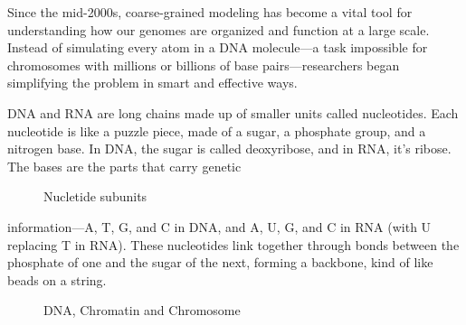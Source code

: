 \documentclass[12pt]{article}
\begin{document}
\begin{flushleft}
Since the mid-2000s, coarse-grained modeling has become a vital tool for understanding how our genomes are organized and function at a large scale. Instead of simulating every atom in a DNA molecule—a task impossible for chromosomes with millions or billions of base pairs—researchers began simplifying the problem in smart and effective ways.

DNA and RNA are long chains made up of smaller units called nucleotides. Each nucleotide is like a puzzle piece, made of a sugar, a phosphate group, and a nitrogen base. In DNA, the sugar is called deoxyribose, and in RNA, it’s ribose. The bases are the parts that carry genetic 

\begin{figure}[!ht]
  \centering
  

  \caption{Nucletide subunits}
\end{figure}


\noindent information—A, T, G, and C in DNA, and A, U, G, and C in RNA (with U replacing T in RNA). These nucleotides link together through bonds between the phosphate of one and the sugar of the next, forming a backbone, kind of like beads on a string. 









\begin{figure}[!ht]
  \centering
  
  \caption{DNA, Chromatin and Chromosome\cite{byjus_chromatin}}
\end{figure}


\end{flushleft}
\end{document}
